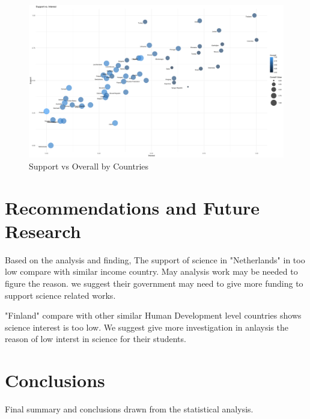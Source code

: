 \documentclass[12pt]{article}
\begin{document}
\begin{figure}[htb]
  \centering
  \includegraphics[width=\linewidth]{images/interest_support_vs_overall}
  \caption{Support vs Overall by Countries}
  \label{fig:int_sup_overall}
\end{figure}

\section{Recommendations and Future Research}

Based on the analysis and finding, 
The support of science in "Netherlands" in too low compare with similar income country.
May analysis work may be needed to figure the reason. we suggest their government may need to give more funding to support science related works.

"Finland" compare with other similar Human Development level countries shows science interest is too low.
We suggest give more investigation in anlaysis the reason of low interst in science for their students.



\section{Conclusions}

Final summary and conclusions drawn from the statistical analysis.


\newpage
%
%

 
\end{document}
